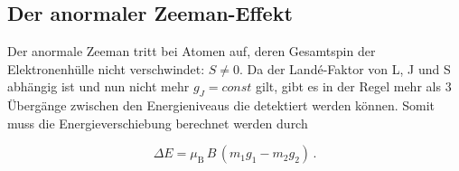 \subsection{Der anormaler Zeeman-Effekt}
Der anormale Zeeman tritt bei Atomen auf, deren Gesamtspin der Elektronenhülle nicht verschwindet: $S \neq 0$. Da der Landé-Faktor von L, J und S abhängig ist und nun nicht mehr 
$g_J = const$ gilt, gibt es in der Regel mehr als 3 Übergänge zwischen den Energieniveaus die detektiert werden können. Somit muss die Energieverschiebung berechnet werden durch 

\vspace{-15pt}
\begin{equation}
    \Delta E = \mu_\text{B}\,B\,(m_1 g_1 - m_2 g_2) \, .
    \label{eqn:anorm}
\end{equation}
